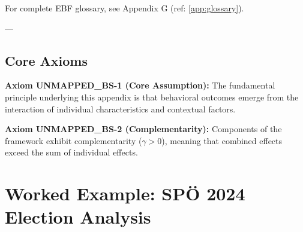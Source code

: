 For complete EBF glossary, see Appendix G (ref: \ref{app:glossary}).

---


\subsection{Core Axioms}
\label{sec:bs-axioms}

\begin{tcolorbox}[colback=yellow!5!white,colframe=yellow!75!black,title=Axiom UNMAPPED_BS-1: Fundamental Principle]
\textbf{Axiom UNMAPPED_BS-1 (Core Assumption):}
The fundamental principle underlying this appendix is that behavioral outcomes
emerge from the interaction of individual characteristics and contextual factors.
\end{tcolorbox}

\begin{tcolorbox}[colback=yellow!5!white,colframe=yellow!75!black,title=Axiom UNMAPPED_BS-2: Complementarity]
\textbf{Axiom UNMAPPED_BS-2 (Complementarity):}
Components of the framework exhibit complementarity ($\gamma > 0$), meaning
that combined effects exceed the sum of individual effects.
\end{tcolorbox}



\section{Worked Example: SPÖ 2024 Election Analysis}
\label{sec:bs-worked-example}


